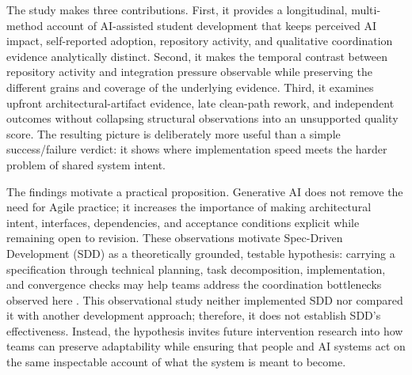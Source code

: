 The study makes three contributions. First, it provides a longitudinal,
multi-method account of AI-assisted student development that keeps perceived
AI impact, self-reported adoption, repository activity, and qualitative
coordination evidence analytically distinct. Second, it makes the temporal
contrast between repository activity and integration pressure observable while
preserving the different grains and coverage of the underlying evidence.
Third, it examines upfront architectural-artifact evidence, late clean-path
rework, and independent outcomes without collapsing structural observations
into an unsupported quality score. The resulting picture is deliberately more
useful than a simple success/failure verdict: it shows where implementation
speed meets the harder problem of shared system intent.

The findings motivate a practical proposition. Generative AI does not remove
the need for Agile practice; it increases the importance of making architectural
intent, interfaces, dependencies, and acceptance conditions explicit while
remaining open to revision. These observations motivate Spec-Driven
Development (SDD) as a theoretically grounded, testable hypothesis: carrying a
specification through technical planning, task decomposition, implementation,
and convergence checks may help teams address the coordination bottlenecks
observed here \cite{github2025spec,thoughtworks202Xspec}. This observational
study neither implemented SDD nor compared it with another development
approach; therefore, it does not establish SDD's effectiveness. Instead, the
hypothesis invites future intervention research into how teams can preserve
adaptability while ensuring that people and AI systems act on the same
inspectable account of what the system is meant to become.
